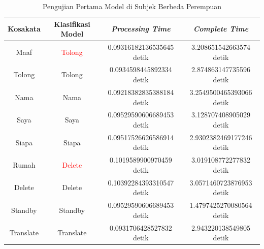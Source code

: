 \begin{longtable}{|c|c|c|c|}
  \caption{Pengujian Pertama Model di Subjek Berbeda Perempuan}
  \label{tb:prediksiperempuan1}                                   \\
  \hline
  \rowcolor[HTML]{C0C0C0}
  \textbf{Kosakata} & \textbf{Klasifikasi Model} & \textbf{\emph{Processing Time}} & \textbf{\emph{Complete Time}}\\
  \hline
  Maaf              & \textcolor{red}{Tolong}       & 0.09316182136535645 detik                           & 3.208651542663574 detik                                \\
  Tolong            & Tolong                        & 0.0934598445892334 detik                            & 2.874863147735596 detik                                \\
  Nama              & Nama                          & 0.09218382835388184 detik                           & 3.2549500465393066 detik                                 \\
  Saya              & Saya                          & 0.09529590606689453 detik                           & 3.128707408905029 detik                                \\
  Siapa              & Siapa                        & 0.09517526626586914 detik                           & 2.9302382469177246 detik                                 \\
  Rumah             & \textcolor{red}{Delete}       & 0.1019589900970459 detik                            & 3.019108772277832 detik                                \\
  Delete            & Delete                        & 0.10392284393310547 detik                           & 3.0571460723876953 detik                                 \\
  Standby           & Standby                       & 0.09529590606689453 detik                           & 1.4797425270080564 detik                                 \\
  Translate         & Translate                     & 0.0931706428527832 detik                            & 2.943220138549805 detik                                \\
  \hline
\end{longtable}

